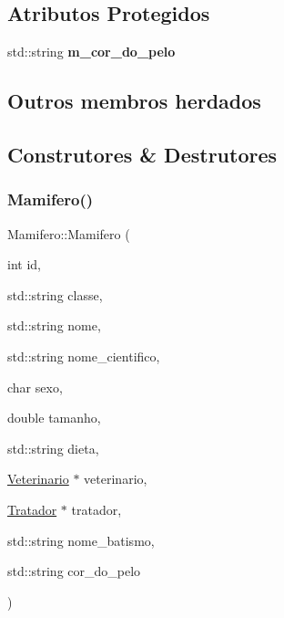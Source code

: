 \subsection*{Atributos Protegidos}
\begin{DoxyCompactItemize}
\item 
\mbox{\label{classMamifero_a18ace1f3a5c5412f3bfc49293f30522d}} 
std\+::string {\bfseries m\+\_\+cor\+\_\+do\+\_\+pelo}
\end{DoxyCompactItemize}
\subsection*{Outros membros herdados}


\subsection{Construtores \& Destrutores}
\mbox{\label{classMamifero_a7f460155291cfc4ceea97bd74cc9e763}} 
\subsubsection{\texorpdfstring{Mamifero()}{Mamifero()}\hspace{0.1cm}{\footnotesize\ttfamily [1/3]}}
{\footnotesize\ttfamily Mamifero\+::\+Mamifero (\begin{DoxyParamCaption}\item[{int}]{id,  }\item[{std\+::string}]{classe,  }\item[{std\+::string}]{nome,  }\item[{std\+::string}]{nome\+\_\+cientifico,  }\item[{char}]{sexo,  }\item[{double}]{tamanho,  }\item[{std\+::string}]{dieta,  }\item[{\hyperlink{classVeterinario}{Veterinario} $\ast$}]{veterinario,  }\item[{\hyperlink{classTratador}{Tratador} $\ast$}]{tratador,  }\item[{std\+::string}]{nome\+\_\+batismo,  }\item[{std\+::string}]{cor\+\_\+do\+\_\+pelo }\end{DoxyParamCaption})}



